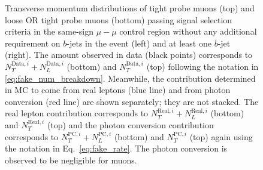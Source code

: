\begin{figure}[ht]
{}
\caption{Transverse momentum distributions of tight probe 
muons (top) and loose OR tight probe muons (bottom) passing signal 
selection criteria in the same-sign $\mu-\mu$ control region 
without any additional requirement on $b$-jets in the event (left) and 
at least one $b$-jet (right). 
The amount observed in data (black points) corresponds 
to $N_T^{\textrm{Data},i}+N_L^{\textrm{Data},i}$ (bottom) and $N_T^{\textrm{Data},i}$ (top) following the notation
in \eqn\ref{eq:fake_num_breakdown}.
Meanwhile, the contribution determined in MC to come from 
real leptons (blue line) and from photon conversion (red line) are shown 
separately; they are not stacked. The real lepton contribution corresponds to 
$N_T^{\textrm{Real},i}+N_L^{\textrm{Real},i}$ (bottom) and $N_T^{\textrm{Real},i}$ 
(top) and the photon conversion 
contribution 
corresponds to $N_T^{\textrm{PC},i}+N_L^{\textrm{PC},i}$ (bottom) 
and $N_T^{\textrm{PC},i}$ (top) again using the notation 
in Eq.~\ref{eq:fake_rate}. 
The photon conversion is 
observed to be negligible for muons.  }
\label{fig:fakeEff_CRs_muon}
\end{figure}

